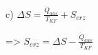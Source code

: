 c) \( \Delta S = \frac{\dot{Q}_{aus}}{T_{KF}} + S_{erz} \)  

=> \( S_{erz} = \Delta S - \frac{\dot{Q}_{aus}}{T_{KF}} \)